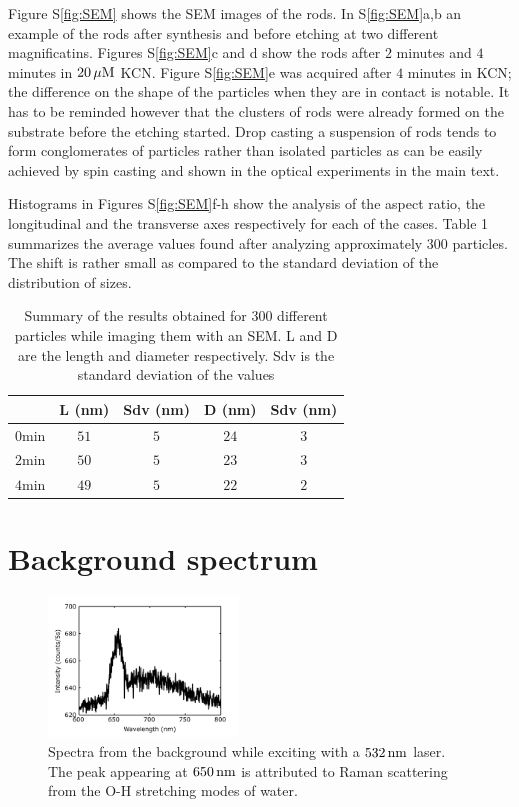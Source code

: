 Figure S\ref{fig:SEM} shows the SEM images of the rods. In S\ref{fig:SEM}a,b an
example of the rods after synthesis and before etching at two different
magnificatins. Figures S\ref{fig:SEM}c and d show the rods after $2$ minutes and
$4$ minutes in $20\,\mu\textrm{M}$ KCN. Figure S\ref{fig:SEM}e was acquired after $4$
minutes in KCN; the difference on the shape of the particles when they are in
contact is notable. It has to be reminded however that the clusters of rods were
already formed on the substrate before the etching started. Drop casting a
suspension of rods tends to form conglomerates of particles rather than isolated
particles as can be easily achieved by spin casting and shown in the optical
experiments in the main text.

Histograms in Figures S\ref{fig:SEM}f-h show the
analysis of the aspect ratio, the longitudinal and the transverse axes
respectively for each of the cases. Table 1 summarizes the average values found
after analyzing approximately $300$ particles. The shift is rather small as
compared to the standard deviation of the distribution of sizes. 

\begin{table}[htp]
\begin{tabular*}{0.48\textwidth}{c c c c c}
 $\,$ & L (nm) & Sdv (nm) & D (nm) & Sdv (nm) \\\hline
 $0\textrm{min}$ & $51$ & $5$ & $24$ & $3$ \\
 $2\textrm{min}$ & $50$ & $5$ & $23$ & $3$ \\
 $4\textrm{min}$ & $49$ & $5$ & $22$ & $2$ \\
\end{tabular*}
\label{tab:SEM_results}
\caption{Summary of the results obtained for 300 different particles while
imaging them with an SEM. L and D are the length and diameter respectively.
Sdv is the standard deviation of the values}
\end{table}

\section{Background spectrum}

\begin{figure}[htp]
 \centering
 \includegraphics[width=0.45\textwidth]{Chapters/02_KCN/Figures/04_Supporting/03_Background/background.png}
 \caption{Spectra from the background while exciting with a $532\,\textrm{nm}$ laser. The
 peak appearing at $650\,\textrm{nm}$ is attributed to Raman scattering from the O-H stretching modes of water.}
 \label{fig:Background}
\end{figure}

